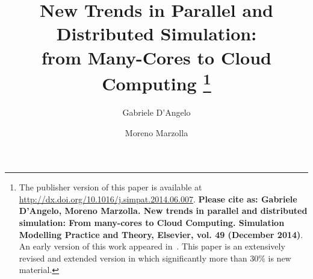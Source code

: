\documentclass[1p]{elsarticle}
\begin{document}
\begin{frontmatter}

\title{New Trends in Parallel and Distributed Simulation:\\ from 
    Many-Cores to Cloud Computing
\footnote{The publisher version of this paper is available at \url{http://dx.doi.org/10.1016/j.simpat.2014.06.007}. \textbf{{\color{red}Please cite as: Gabriele D'Angelo, Moreno Marzolla. New trends in parallel and distributed simulation: From many-cores to Cloud Computing. Simulation Modelling Practice and Theory, Elsevier, vol. 49 (December 2014)}}.
An early version of this work appeared in~\cite{gda-hpcs-11}. This paper is an extensively revised and extended version in which significantly more than 30\% is new material.}}

\author{Gabriele D'Angelo}

\author{Moreno Marzolla}

\address{Department of Computer Science and Engineering. University of Bologna, Italy.}



\end{frontmatter}
\end{document}
